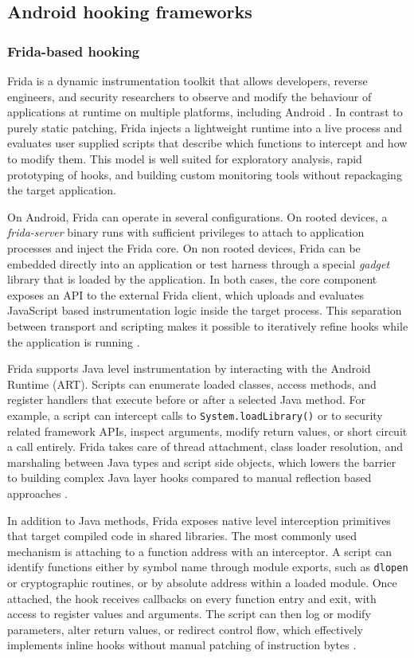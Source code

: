 \documentclass[11pt,a4paper]{report}
\renewcommand\_{{\textunderscore\allowbreak}}
\begin{document}
\subsection{Android hooking frameworks}

\subsubsection{Frida-based hooking}

Frida is a dynamic instrumentation toolkit that allows developers, reverse engineers, and security researchers to observe and modify the behaviour of applications at runtime on multiple platforms, including Android \cite{frida2023official}. In contrast to purely static patching, Frida injects a lightweight runtime into a live process and evaluates user supplied scripts that describe which functions to intercept and how to modify them. This model is well suited for exploratory analysis, rapid prototyping of hooks, and building custom monitoring tools without repackaging the target application.

On Android, Frida can operate in several configurations. On rooted devices, a \textit{frida-server} binary runs with sufficient privileges to attach to application processes and inject the Frida core. On non rooted devices, Frida can be embedded directly into an application or test harness through a special \textit{gadget} library that is loaded by the application. In both cases, the core component exposes an API to the external Frida client, which uploads and evaluates JavaScript based instrumentation logic inside the target process. This separation between transport and scripting makes it possible to iteratively refine hooks while the application is running \cite{frida2023official}.

Frida supports Java level instrumentation by interacting with the Android Runtime (ART). Scripts can enumerate loaded classes, access methods, and register handlers that execute before or after a selected Java method. For example, a script can intercept calls to \texttt{System.loadLibrary()} or to security related framework APIs, inspect arguments, modify return values, or short circuit a call entirely. Frida takes care of thread attachment, class loader resolution, and marshaling between Java types and script side objects, which lowers the barrier to building complex Java layer hooks compared to manual reflection based approaches \cite{frida2023official,kumar2023inviseal}.

In addition to Java methods, Frida exposes native level interception primitives that target compiled code in shared libraries. The most commonly used mechanism is attaching to a function address with an interceptor. A script can identify functions either by symbol name through module exports, such as \texttt{dlopen} or cryptographic routines, or by absolute address within a loaded module. Once attached, the hook receives callbacks on every function entry and exit, with access to register values and arguments. The script can then log or modify parameters, alter return values, or redirect control flow, which effectively implements inline hooks without manual patching of instruction bytes \cite{ronin2018hooking}.
\end{document}
